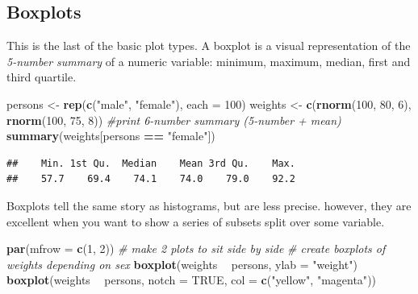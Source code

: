 \documentclass[]{book}
\newenvironment{Shaded}{\begin{snugshade}}{\end{snugshade}}
\newcommand{\CommentTok}[1]{\textcolor[rgb]{0.56,0.35,0.01}{\textit{#1}}}
\newcommand{\DataTypeTok}[1]{\textcolor[rgb]{0.13,0.29,0.53}{#1}}
\newcommand{\DecValTok}[1]{\textcolor[rgb]{0.00,0.00,0.81}{#1}}
\newcommand{\KeywordTok}[1]{\textcolor[rgb]{0.13,0.29,0.53}{\textbf{#1}}}
\newcommand{\NormalTok}[1]{#1}
\newcommand{\OperatorTok}[1]{\textcolor[rgb]{0.81,0.36,0.00}{\textbf{#1}}}
\newcommand{\OtherTok}[1]{\textcolor[rgb]{0.56,0.35,0.01}{#1}}
\newcommand{\StringTok}[1]{\textcolor[rgb]{0.31,0.60,0.02}{#1}}
\begin{document}
\hypertarget{boxplots}{%
\subsection{Boxplots}\label{boxplots}}

This is the last of the basic plot types. A boxplot is a visual representation of the \emph{5-number summary} of a numeric variable: minimum, maximum, median, first and third quartile.

\begin{Shaded}
\begin{Highlighting}[]
\NormalTok{persons <-}\StringTok{ }\KeywordTok{rep}\NormalTok{(}\KeywordTok{c}\NormalTok{(}\StringTok{"male"}\NormalTok{, }\StringTok{"female"}\NormalTok{), }\DataTypeTok{each =} \DecValTok{100}\NormalTok{)}
\NormalTok{weights <-}\StringTok{ }\KeywordTok{c}\NormalTok{(}\KeywordTok{rnorm}\NormalTok{(}\DecValTok{100}\NormalTok{, }\DecValTok{80}\NormalTok{, }\DecValTok{6}\NormalTok{), }\KeywordTok{rnorm}\NormalTok{(}\DecValTok{100}\NormalTok{, }\DecValTok{75}\NormalTok{, }\DecValTok{8}\NormalTok{))}
\CommentTok{#print 6-number summary (5-number + mean)}
\KeywordTok{summary}\NormalTok{(weights[persons }\OperatorTok{==}\StringTok{ "female"}\NormalTok{])}
\end{Highlighting}
\end{Shaded}

\begin{verbatim}
##    Min. 1st Qu.  Median    Mean 3rd Qu.    Max. 
##    57.7    69.4    74.1    74.0    79.0    92.2
\end{verbatim}

Boxplots tell the same story as histograms, but are less precise. however, they are excellent when you want to show a series of subsets split over some variable.

\begin{Shaded}
\begin{Highlighting}[]
\KeywordTok{par}\NormalTok{(}\DataTypeTok{mfrow =} \KeywordTok{c}\NormalTok{(}\DecValTok{1}\NormalTok{, }\DecValTok{2}\NormalTok{)) }\CommentTok{# make 2 plots to sit side by side}
\CommentTok{# create boxplots of weights depending on sex}
\KeywordTok{boxplot}\NormalTok{(weights }\OperatorTok{~}\StringTok{ }\NormalTok{persons, }\DataTypeTok{ylab =} \StringTok{"weight"}\NormalTok{)}
\KeywordTok{boxplot}\NormalTok{(weights }\OperatorTok{~}\StringTok{ }\NormalTok{persons, }\DataTypeTok{notch =} \OtherTok{TRUE}\NormalTok{, }\DataTypeTok{col =} \KeywordTok{c}\NormalTok{(}\StringTok{"yellow"}\NormalTok{, }\StringTok{"magenta"}\NormalTok{))}
\end{Highlighting}
\end{Shaded}
\end{document}

